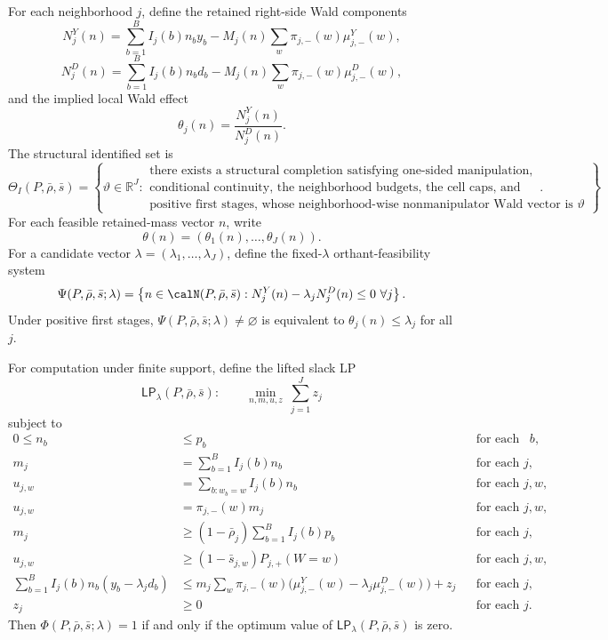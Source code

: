 \documentclass[11pt]{article}
\newcommand{\R}{\mathbb{R}}
\theoremstyle{definition}
\theoremstyle{plain}
\theoremstyle{remark}
\begin{document}
For each neighborhood \(j\), define the retained right-side Wald components
\[
  N_j^Y(n)=\sum_{b=1}^B I_j(b)n_b y_b - M_j(n)\sum_w \pi_{j,-}(w)\mu_{j,-}^Y(w),
\]
\[
  N_j^D(n)=\sum_{b=1}^B I_j(b)n_b d_b - M_j(n)\sum_w \pi_{j,-}(w)\mu_{j,-}^D(w),
\]
and the implied local Wald effect
\[
  \theta_j(n)=\frac{N_j^Y(n)}{N_j^D(n)}.
\]
The structural identified set is
\[
  \Theta_I(P,\bar\rho,\bar s)
  =
  \left\{
    \vartheta\in\R^J:
    \begin{array}{l}
      \text{there exists a structural completion satisfying one-sided manipulation,}\\
      \text{conditional continuity, the neighborhood budgets, the cell caps, and}\\
      \text{positive first stages, whose neighborhood-wise nonmanipulator Wald vector is }\vartheta
    \end{array}
  \right\}.
\]
For each feasible retained-mass vector \(n\), write
\[
  \theta(n)=(\theta_1(n),\ldots,\theta_J(n)).
\]
For a candidate vector \(\lambda=(\lambda_1,\ldots,\lambda_J)\), define the fixed-\(\lambda\)
orthant-feasibility system
\[
  \Psi(P,\bar\rho,\bar s;\lambda)=
  \left\{n\in\calN(P,\bar\rho,\bar s):
    N_j^Y(n)-\lambda_j N_j^D(n)\le 0\ \forall j
  \right\}.
\]
Under positive first stages, \(\Psi(P,\bar\rho,\bar s;\lambda)\neq\varnothing\) is equivalent to
\(\theta_j(n)\le\lambda_j\) for all \(j\).

For computation under finite support, define the lifted slack LP
\[
  \mathsf{LP}_\lambda(P,\bar\rho,\bar s):
  \qquad
  \min_{n,m,u,z}\ \sum_{j=1}^J z_j
\]
subject to
\begin{align}
  0\le n_b &\le p_b && \text{for each atom }b, \label{eq:atom-capacity}\\
  m_j &= \sum_{b=1}^B I_j(b)n_b && \text{for each }j, \label{eq:mj-def}\\
  u_{j,w} &= \sum_{b:w_b=w} I_j(b)n_b && \text{for each }j,w, \label{eq:ujw-def}\\
  u_{j,w} &= \pi_{j,-}(w)m_j && \text{for each }j,w, \label{eq:ujw-match}\\
  m_j &\ge (1-\bar\rho_j)\sum_{b=1}^B I_j(b)p_b && \text{for each }j, \label{eq:mj-budget}\\
  u_{j,w} &\ge (1-\bar s_{j,w})P_{j,+}(W=w) && \text{for each }j,w, \label{eq:ujw-budget}\\
  \sum_{b=1}^B I_j(b)n_b(y_b-\lambda_j d_b)
  &\le
  m_j\sum_w \pi_{j,-}(w)\bigl(\mu_{j,-}^Y(w)-\lambda_j\mu_{j,-}^D(w)\bigr)+z_j
  && \text{for each }j, \label{eq:score-slack}\\
  z_j &\ge 0 && \text{for each }j. \label{eq:score-slack-nonneg}
\end{align}
Then \(\Phi(P,\bar\rho,\bar s;\lambda)=1\) if and only if the optimum value of
\(\mathsf{LP}_\lambda(P,\bar\rho,\bar s)\) is zero.
\end{document}
